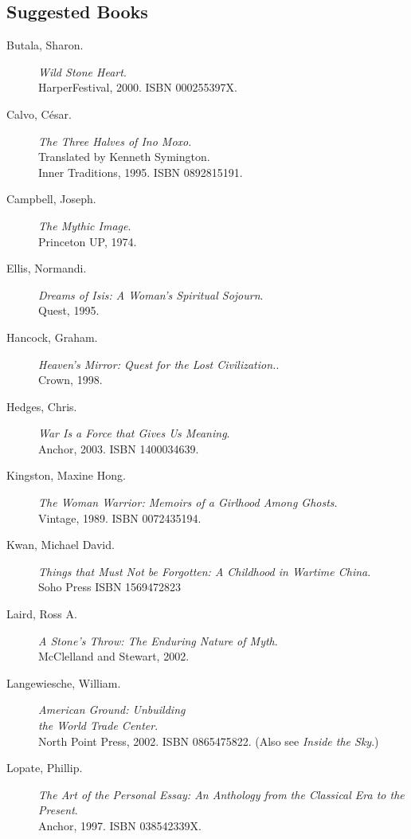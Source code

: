 \documentclass[letterpaper,10pt,headsepline]{scrreprt}
\begin{document}
\subsection{Suggested Books}
\begin{description}
\item [Butala, Sharon.] \textit{Wild Stone Heart}. \\HarperFestival,
  2000. \textsc{ISBN 000255397X}.
\item [Calvo, C\'esar.] \textit{The Three Halves of Ino Moxo}.
  \\Translated by Kenneth Symington. \\Inner Traditions, 1995.
  \textsc{ISBN 0892815191}.
\item [Campbell, Joseph.] \textit{The Mythic Image}.
  \\Princeton UP, 1974.
\item [Ellis, Normandi.] \textit{Dreams of Isis: A Woman's Spiritual
    Sojourn}.
  \\Quest, 1995.
\item [Hancock, Graham.] \textit{Heaven's Mirror: Quest for the Lost
    Civilization.}.
  \\Crown, 1998.
\item [Hedges, Chris.] \textit{War Is a Force that Gives Us Meaning}.
  \\Anchor, 2003. \textsc{ISBN 1400034639}.
\item [Kingston, Maxine Hong.] \textit{The Woman Warrior: Memoirs of a
    Girlhood Among Ghosts}. \\Vintage, 1989. \textsc{ISBN
    0072435194}.
\item [Kwan, Michael David.] \textit{Things that Must Not be
    Forgotten: A Childhood in Wartime China}. \\Soho Press
  \textsc{ISBN 1569472823}
\item [Laird, Ross A.] \textit{A Stone's Throw: The Enduring Nature of Myth}. \\McClelland and Stewart, 2002.
\item [Langewiesche, William.] \textit{American Ground: Unbuilding
    \\the World Trade Center}. \\North Point Press, 2002.
  \textsc{ISBN 0865475822}. (Also see \textit{Inside the Sky}.)
\item [Lopate, Phillip.] \textit{The Art of the Personal Essay: An
    Anthology from the Classical Era to the Present}. \\Anchor, 1997.
  \textsc{ISBN 038542339X}.

\end{description}
\end{document}

